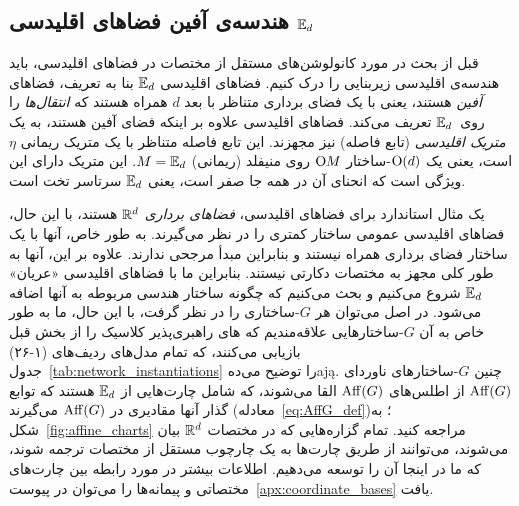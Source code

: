 

\subsection
[هندسه‌ی آفین فضاهای اقلیدسی \texorpdfstring{$\Euc_d$}{}]%
{هندسه‌ی آفین فضاهای اقلیدسی $\Euc_d$}
\label{sec:euclidean_geometry}


قبل از بحث در مورد کانولوشن‌های مستقل از مختصات در فضاهای اقلیدسی، باید هندسه‌ی اقلیدسی زیربنایی را درک کنیم.
فضاهای اقلیدسی $\Euc_d$ بنا به تعریف، فضاهای \emph{آفین} هستند، یعنی با یک فضای برداری متناظر با بعد $d$ همراه هستند که \emph{انتقال‌ها} را روی~$\Euc_d$ تعریف می‌کند.
فضاهای اقلیدسی علاوه بر اینکه فضای آفین هستند، به یک \emph{متریک اقلیدسی} (تابع فاصله) نیز مجهزند.
این تابع فاصله متناظر با یک متریک ریمانی $\eta$ است، یعنی یک $\operatorname{O}(d)$-ساختار $\operatorname{O}\mkern-3.6muM$ روی منیفلد (ریمانی) $M=\mathbb{E}_d$.
این متریک دارای این ویژگی است که انحنای آن در همه جا صفر است، یعنی $\Euc_d$ سرتاسر تخت است.


یک مثال استاندارد برای فضاهای اقلیدسی، \emph{فضاهای برداری} $\mathbb{R}^d$ هستند، با این حال، فضاهای اقلیدسی عمومی ساختار کمتری را در نظر می‌گیرند.
به طور خاص، آنها با یک ساختار فضای برداری همراه نیستند و بنابراین مبدأ مرجحی ندارند.
علاوه بر این، آنها به طور کلی مجهز به مختصات دکارتی نیستند.
بنابراین ما با فضاهای اقلیدسی «عریان» $\Euc_d$ شروع می‌کنیم و بحث می‌کنیم که چگونه ساختار هندسی مربوطه به آنها اضافه می‌شود.
در اصل می‌توان هر $G$-ساختاری را در نظر گرفت، با این حال، ما به طور خاص به آن $G$-ساختارهایی علاقه‌مندیم که های راهبری‌پذیر کلاسیک را از بخش قبل بازیابی می‌کنند، که تمام مدل‌های ردیف‌های (۱-۲۶) جدول~\ref{tab:network_instantiations} را توضیح می‌دهają.
چنین $G$-ساختارهای ناوردای $\operatorname{Aff}(G)$ از اطلس‌های $\operatorname{Aff}(G)$ القا می‌شوند، که شامل چارت‌هایی از $\Euc_d$ هستند که توابع گذار آنها مقادیری در $\operatorname{Aff}(G)$ می‌گیرند (معادله~\eqref{eq:AffG_def})؛ به شکل~\ref{fig:affine_charts} مراجعه کنید.
تمام گزاره‌هایی که در مختصات $\mathbb{R}^d$ بیان می‌شوند، می‌توانند از طریق چارت‌ها به یک چارچوب مستقل از مختصات ترجمه شوند، که ما در اینجا آن را توسعه می‌دهیم.
اطلاعات بیشتر در مورد رابطه بین چارت‌های مختصاتی و پیمانه‌ها را می‌توان در پیوست~\ref{apx:coordinate_bases} یافت.

